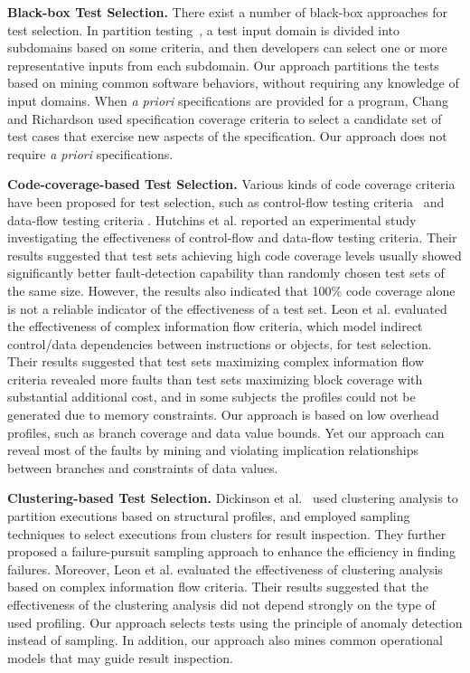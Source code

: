 \documentclass{sig-alternate}
\begin{document}
\textbf{Black-box Test Selection.} There exist a number of
black-box approaches for test selection. In partition
testing~\cite{Myers79}, a test input domain is divided into
subdomains based on some criteria, and then developers can select
one or more representative inputs from each subdomain. Our approach
partitions the tests based on mining common software behaviors,
without requiring any knowledge of input domains. When \emph{a
priori} specifications are provided for a program, Chang and
Richardson \cite{Chang99} used specification coverage criteria to
select a candidate set of test cases that exercise new aspects of
the specification. Our approach does not require \emph{a priori}
specifications.


\textbf{Code-coverage-based Test Selection.} Various kinds of code
coverage criteria have been proposed for test selection, such as
control-flow testing criteria~\cite{Huang75} and data-flow testing
criteria \cite{Frankl88}. Hutchins et al. \cite{Hutchins94} reported
an experimental study investigating the effectiveness of
control-flow and data-flow testing criteria. Their results suggested
that test sets achieving high code coverage levels usually showed
significantly better fault-detection capability than randomly chosen
test sets of the same size. However, the results also indicated that
100\% code coverage alone is not a reliable indicator of the
effectiveness of a test set. Leon et al. \cite{Leon05} evaluated the
effectiveness of complex information flow criteria, which model
indirect control/data dependencies between instructions or objects,
for test selection. Their results suggested that test sets
maximizing complex information flow criteria revealed more faults
than test sets maximizing block coverage with substantial additional
cost, and in some subjects the profiles could not be generated due
to memory constraints. Our approach is based on low overhead
profiles, such as branch coverage and data value bounds. Yet our
approach can reveal most of the faults by mining and violating
implication relationships between branches and constraints of data
values.

\textbf{Clustering-based Test Selection.} Dickinson et
al.~\cite{Dickinson01a} used clustering analysis to partition
executions based on structural profiles, and employed sampling
techniques to select executions from clusters for result inspection.
They further proposed a failure-pursuit sampling approach
\cite{Dickinson01b} to enhance the efficiency in finding failures.
Moreover, Leon et al. \cite{Leon05} evaluated the effectiveness of
clustering analysis based on complex information flow criteria.
Their results suggested that the effectiveness of the clustering
analysis did not depend strongly on the type of used profiling. Our
approach selects tests using the principle of anomaly detection
instead of sampling. In addition, our approach also mines common
operational models that may guide result inspection.
\end{document}
